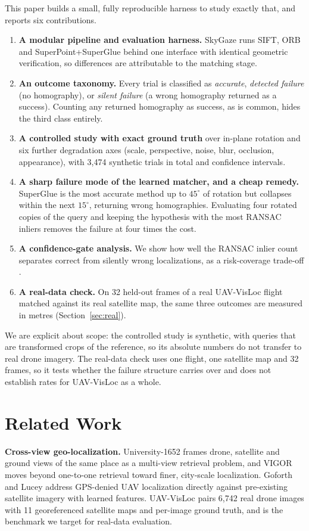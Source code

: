 \documentclass[conference]{IEEEtran}
\begin{document}
This paper builds a small, fully reproducible harness to study exactly that, and reports six contributions.
\begin{enumerate}
\item \textbf{A modular pipeline and evaluation harness.} SkyGaze runs SIFT, ORB and SuperPoint+SuperGlue behind one interface with identical geometric verification, so differences are attributable to the matching stage.
\item \textbf{An outcome taxonomy.} Every trial is classified as \emph{accurate}, \emph{detected failure} (no homography), or \emph{silent failure} (a wrong homography returned as a success). Counting any returned homography as success, as is common, hides the third class entirely.
\item \textbf{A controlled study with exact ground truth} over in-plane rotation and six further degradation axes (scale, perspective, noise, blur, occlusion, appearance), with 3{,}474 synthetic trials in total and confidence intervals.
\item \textbf{A sharp failure mode of the learned matcher, and a cheap remedy.} SuperGlue is the most accurate method up to $45^\circ$ of rotation but collapses within the next $15^\circ$, returning wrong homographies. Evaluating four rotated copies of the query and keeping the hypothesis with the most RANSAC inliers removes the failure at four times the cost.
\item \textbf{A confidence-gate analysis.} We show how well the RANSAC inlier count separates correct from silently wrong localizations, as a risk-coverage trade-off \cite{elyaniv2010foundations}.
\item \textbf{A real-data check.} On 32 held-out frames of a real UAV-VisLoc flight matched against its real satellite map, the same three outcomes are measured in metres (Section~\ref{sec:real}).
\end{enumerate}
We are explicit about scope: the controlled study is synthetic, with queries that are transformed crops of the reference, so its absolute numbers do not transfer to real drone imagery. The real-data check uses one flight, one satellite map and 32 frames, so it tests whether the failure structure carries over and does not establish rates for UAV-VisLoc as a whole.

\section{Related Work}

\textbf{Cross-view geo-localization.} University-1652 \cite{zheng2020university} frames drone, satellite and ground views of the same place as a multi-view retrieval problem, and VIGOR \cite{zhu2021vigor} moves beyond one-to-one retrieval toward finer, city-scale localization. Goforth and Lucey \cite{goforth2019gps} address GPS-denied UAV localization directly against pre-existing satellite imagery with learned features. UAV-VisLoc \cite{xu2024uavvisloc} pairs 6{,}742 real drone images with 11 georeferenced satellite maps and per-image ground truth, and is the benchmark we target for real-data evaluation.
\end{document}
